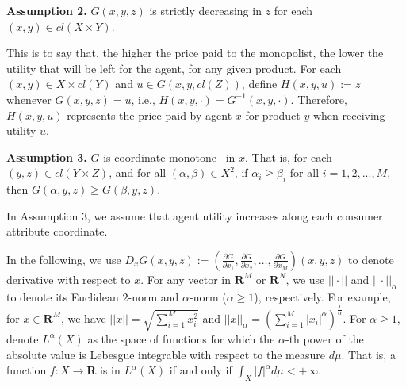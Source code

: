 \documentclass[a4paper, 11pt]{amsart}
\numberwithin{equation}{section}
\theoremstyle{plain}
\theoremstyle{definition}
\theoremstyle{remark}
\newcommand{\R}{\mathbf{R}}
\begin{document}
\begin{comment}
	{{\bf Assumption 1.} %
	The mapping $(y,z) \in cl(Y \times Z) \mapsto (D_xG, G)(x, y,z)$ is one-to-one for %
	each $x\in X$.}\medskip
	
	{Assumption 1 is the so-called twist condition which is the similar/dual to but much less restrictive than the generalized single crossing condition proposed by McAfee-McMillan \cite{McAfeeMcMillan88}. Comparing to Figalli-Kim-McCann \cite{FigalliKimMcCann11}, Assumption 1 only has half of the bi-twist condition.}\medskip
\end{comment}



{\bf Assumption 2.} $G(x,y,z)$ is strictly decreasing in $z$ %
for each $(x,y) \in cl(X \times Y)$.\medskip



This is to say that, the higher the price paid to the monopolist, the lower the utility that will be left for the agent, for any given product. %
For each $(x, y) \in X\times cl(Y)$ %
and $u\in G(x,y, cl(Z))$, define $H(x,y,u) := z$ %
whenever $G(x,y,z) = u$, i.e., $H(x, y, \cdot)= G^{-1}(x,y,\cdot)$. Therefore, $H(x,y,u)$ represents the price paid by agent $x$ for product $y$ when receiving utility $u$.\medskip

{\bf Assumption 3.} $G$ is coordinate-monoton{e}%
~in $x$. That is, for each $(y,z)\in cl(Y\times Z)$, and for all $ (\alpha, \beta) \in X^2$, if $\alpha_i\ge \beta_i$ for all $ i=1,2,...,M$, then $G(\alpha,y,z)\ge G(\beta, y,z)$.\medskip

In Assumption 3, we assume that agent utility increases along each consumer attribute coordinate.\medskip



 {In the following, we use  $D_x G(x,y,z) := (\frac{\partial G}{\partial x_1}, \frac{\partial G}{\partial x_2}, \dots, \frac{\partial G}{\partial x_M})(x,y,z)$ to denote derivative with respect to $x$. For any vector in $\R^M$ or $\R^N$, we use $||\cdot||$ and $||\cdot||_{\alpha}$ to denote its Euclidean  $2$-norm and $\alpha$-norm ($\alpha \ge 1$), respectively. For example, for $x\in \R^M$, we have $||x|| = \sqrt{\sum_{i=1}^{M} x_i^2}$ and $||x||_{\alpha} = (\sum_{i=1}^{M} |x_i|^{\alpha})^{\frac{1}{\alpha}}$. For $\alpha \ge 1$, denote $L^{\alpha}(X)$ as the space of functions for which the $\alpha$-th power of the absolute value is Lebesgue integrable {with respect to the measure $d \mu$}. That is, a function $f: X\rightarrow \R$ is in $L^{\alpha}(X)$ if and only if $\int_{X} |f|^{\alpha} d\mu <+\infty$.}\medskip
\end{document}
